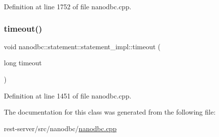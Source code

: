 Definition at line 1752 of file nanodbc.\+cpp.

\mbox{\label{classnanodbc_1_1statement_1_1statement__impl_abccb352dfb3ba5143c049017062b9dbd}} 
\subsubsection{\texorpdfstring{timeout()}{timeout()}}
{\footnotesize\ttfamily void nanodbc\+::statement\+::statement\+\_\+impl\+::timeout (\begin{DoxyParamCaption}\item[{long}]{timeout }\end{DoxyParamCaption})\hspace{0.3cm}{\ttfamily [inline]}}



Definition at line 1451 of file nanodbc.\+cpp.



The documentation for this class was generated from the following file\+:\begin{DoxyCompactItemize}
\item 
rest-\/server/src/nanodbc/\mbox{\hyperlink{nanodbc_8cpp}{nanodbc.\+cpp}}\end{DoxyCompactItemize}
